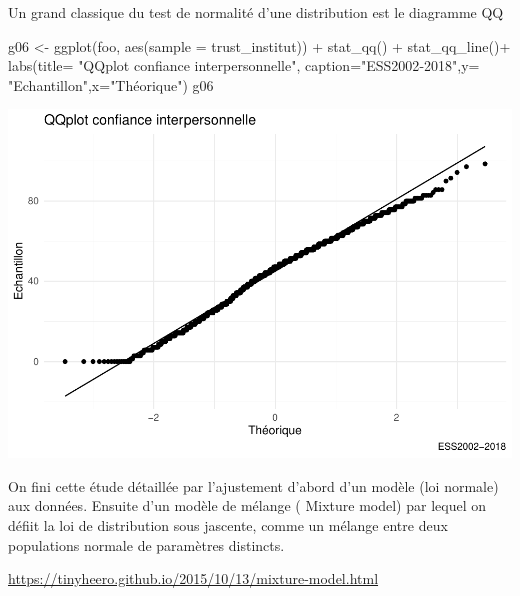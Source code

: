 \documentclass[
]{book}
\newenvironment{Shaded}{\begin{snugshade}}{\end{snugshade}}
\newcommand{\AttributeTok}[1]{\textcolor[rgb]{0.77,0.63,0.00}{#1}}
\newcommand{\FunctionTok}[1]{\textcolor[rgb]{0.00,0.00,0.00}{#1}}
\newcommand{\NormalTok}[1]{#1}
\newcommand{\OtherTok}[1]{\textcolor[rgb]{0.56,0.35,0.01}{#1}}
\newcommand{\SpecialCharTok}[1]{\textcolor[rgb]{0.00,0.00,0.00}{#1}}
\newcommand{\StringTok}[1]{\textcolor[rgb]{0.31,0.60,0.02}{#1}}
\begin{document}
Un grand classique du test de normalité d'une distribution est le diagramme QQ

\begin{Shaded}
\begin{Highlighting}[]
\NormalTok{g06 }\OtherTok{\textless{}{-}} \FunctionTok{ggplot}\NormalTok{(foo, }\FunctionTok{aes}\NormalTok{(}\AttributeTok{sample =}\NormalTok{ trust\_institut)) }\SpecialCharTok{+} 
  \FunctionTok{stat\_qq}\NormalTok{() }\SpecialCharTok{+} \FunctionTok{stat\_qq\_line}\NormalTok{()}\SpecialCharTok{+} 
  \FunctionTok{labs}\NormalTok{(}\AttributeTok{title=} \StringTok{"QQplot confiance interpersonnelle"}\NormalTok{, }\AttributeTok{caption=}\StringTok{"ESS2002{-}2018"}\NormalTok{,}\AttributeTok{y=} \StringTok{"Echantillon"}\NormalTok{,}\AttributeTok{x=}\StringTok{"Théorique"}\NormalTok{) }
\NormalTok{g06}
\end{Highlighting}
\end{Shaded}

\includegraphics{bookdown-demo_files/figure-latex/306-1.pdf}

On fini cette étude détaillée par l'ajustement d'abord d'un modèle (loi normale) aux données. Ensuite d'un modèle de mélange ( Mixture model) par lequel on défiit la loi de distribution sous jascente, comme un mélange entre deux populations normale de paramètres distincts.

\url{https://tinyheero.github.io/2015/10/13/mixture-model.html}

\begin{Shaded}
\end{Shaded}
\end{document}
